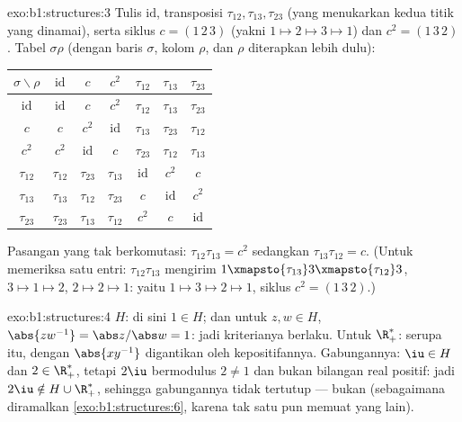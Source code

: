 \begin{solution}{exo:b1:structures:3}
Tulis $\mathrm{id}$, transposisi $\tau_{12}, \tau_{13},
\tau_{23}$ (yang menukarkan kedua titik yang dinamai), serta siklus $c =
(1\,2\,3)$ (yakni $1 \mapsto 2 \mapsto 3 \mapsto 1$) dan $c^2 =
(1\,3\,2)$. Tabel $\sigma\rho$ (dengan baris $\sigma$, kolom $\rho$,
dan $\rho$ diterapkan lebih dulu):
\begin{center}
\renewcommand{\arraystretch}{1.2}
\begin{tabular}{c|cccccc}
$\sigma\backslash\rho$ & $\mathrm{id}$ & $c$ & $c^2$ & $\tau_{12}$ &
$\tau_{13}$ & $\tau_{23}$ \\
\hline
$\mathrm{id}$ & $\mathrm{id}$ & $c$ & $c^2$ & $\tau_{12}$ &
$\tau_{13}$ & $\tau_{23}$ \\
$c$ & $c$ & $c^2$ & $\mathrm{id}$ & $\tau_{13}$ & $\tau_{23}$ &
$\tau_{12}$ \\
$c^2$ & $c^2$ & $\mathrm{id}$ & $c$ & $\tau_{23}$ & $\tau_{12}$ &
$\tau_{13}$ \\
$\tau_{12}$ & $\tau_{12}$ & $\tau_{23}$ & $\tau_{13}$ & $\mathrm{id}$
& $c^2$ & $c$ \\
$\tau_{13}$ & $\tau_{13}$ & $\tau_{12}$ & $\tau_{23}$ & $c$ &
$\mathrm{id}$ & $c^2$ \\
$\tau_{23}$ & $\tau_{23}$ & $\tau_{13}$ & $\tau_{12}$ & $c^2$ & $c$ &
$\mathrm{id}$ \\
\end{tabular}
\end{center}
Pasangan yang tak berkomutasi: $\tau_{12}\tau_{13} = c^2$ sedangkan
$\tau_{13}\tau_{12} = c$. (Untuk memeriksa satu entri:
$\tau_{12}\tau_{13}$ mengirim $1 \xmapsto{\tau_{13}} 3
\xmapsto{\tau_{12}} 3$, $3 \mapsto 1 \mapsto 2$, $2 \mapsto 2 \mapsto
1$: yaitu $1 \mapsto 3 \mapsto 2 \mapsto 1$, siklus $c^2 =
(1\,3\,2)$.)
\end{solution}

\begin{solution}{exo:b1:structures:4}
$H$: di sini $1 \in H$; dan untuk $z, w \in H$, $\abs{zw^{-1}} = \abs z / \abs w =
1$: jadi kriterianya berlaku. Untuk $\R_+^*$: serupa itu, dengan $\abs{xy^{-1}}$ digantikan oleh
kepositifannya. Gabungannya: $\iu \in H$ dan $2 \in \R_+^*$, tetapi $2\iu$ bermodulus
$2 \neq 1$ dan bukan bilangan real positif: jadi $2\iu \notin H \cup
\R_+^*$, sehingga gabungannya tidak tertutup --- bukan  (sebagaimana diramalkan
\cref{exo:b1:structures:6}, karena tak satu pun  memuat yang lain).
\end{solution}


